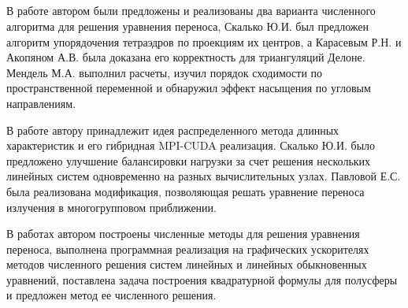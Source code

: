 
\renewcommand{\refname}{\large Публикации автора по теме диссертации}
\nocite{*}
\insertbiblioauthor                          %

\subsection*{\contribution} 
В работе \cite{skalko2014} автором были предложены и реализованы два варианта численного алгоритма для решения уравнения переноса, Скалько Ю.И. был предложен алгоритм упорядочения тетраэдров по проекциям их центров, а Карасевым Р.Н. и Акопяном А.В. была доказана его корректность для триангуляций Делоне. Мендель М.А. выполнил расчеты, изучил порядок сходимости по пространственной переменной и обнаружил эффект насыщения по угловым направлениям.

В работе \cite{tsybulin2015a} автору принадлежит идея распределенного метода длинных характеристик и его гибридная MPI-CUDA реализация. Скалько Ю.И. было предложено улучшение балансировки нагрузки за счет решения нескольких линейных систем одновременно на разных вычислительных узлах. Павловой Е.С. была реализована модификация, позволяющая решать уравнение переноса излучения в многогрупповом приближении.

В работах \cite{tsybulin2015b, miptconf55, miptconf56, miptconf57, miptconf54} автором построены численные методы для решения уравнения переноса, выполнена программная реализация на графических ускорителях методов численного решения систем линейных и линейных обыкновенных уравнений, поставлена задача построения квадратурной формулы для полусферы и предложен метод ее численного решения. 